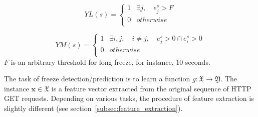 \documentclass[journal]{IEEEtran}
\begin{document}
\begin{equation}
YL(s) =
  \begin{cases}
    1       & \exists{j}, \quad e_j^s>F \\
    0  		& otherwise\\     
  \end{cases}
\end{equation}

\begin{equation}
YM(s) =
  \begin{cases}
    1       & \exists{i,j},\quad i\neq{j},  \quad e_j^s>0\cap{e_i^s>0} \\
    0  		& otherwise\\
  \end{cases}
\end{equation}
$F$ is an arbitrary threshold for long freeze, for instance, 10 seconds.
                                                                                   
The task of freeze detection/prediction is to learn a function $g:\mathfrak{X}\to\mathfrak{Y}$. The instance $\mathbf{x}\in\mathfrak{X}$ is a feature vector extracted from the original sequence of HTTP GET requests. Depending on various tasks, the procedure of feature extraction is slightly different (see section~\ref{subsec:feature_extraction}). 
\end{document}
